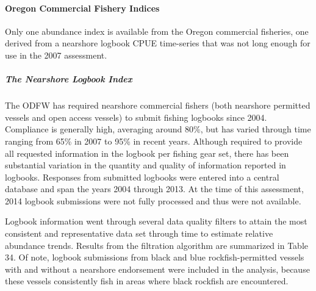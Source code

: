 \documentclass[11pt,
  english,
  letterpaper,
]{article}
\begin{document}
\hypertarget{oregon-commercial-fishery-indices}{%
\paragraph{Oregon Commercial Fishery Indices}\label{oregon-commercial-fishery-indices}}

Only one abundance index is available from the Oregon commercial fisheries, one derived from a nearshore logbook CPUE time-series that was not long enough for use in the 2007 assessment.

\hypertarget{the-nearshore-logbook-index}{%
\subparagraph{The Nearshore Logbook Index}\label{the-nearshore-logbook-index}}

The ODFW has required nearshore commercial fishers (both nearshore permitted vessels and open access vessels) to submit fishing logbooks since 2004. Compliance is generally high, averaging around 80\%, but has varied through time ranging from 65\% in 2007 to 95\% in recent years. Although required to provide all requested information in the logbook per fishing gear set, there has been substantial variation in the quantity and quality of information reported in logbooks. Responses from submitted logbooks were entered into a central database and span the years 2004 through 2013. At the time of this assessment, 2014 logbook submissions were not fully processed and thus were not available.

Logbook information went through several data quality filters to attain the most consistent and representative data set through time to estimate relative abundance trends. Results from the filtration algorithm are summarized in Table 34. Of note, logbook submissions from black and blue rockfish-permitted vessels with and without a nearshore endorsement were included in the analysis, because these vessels consistently fish in areas where black rockfish are encountered.
\end{document}
